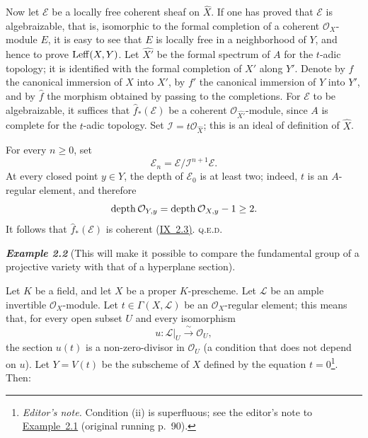 \medskip
Now let $\mathcal E$ be a locally free coherent sheaf on $\widehat X$. If
one has proved that $\mathcal E$ is algebraizable, that is, isomorphic to the
formal completion of a coherent $\mathcal O_X$-module $E$, it is easy to see
that $E$ is locally free in a neighborhood of $Y$, and hence to prove
$\operatorname{Leff}(X,Y)$. Let $\widehat{X'}$ be the formal spectrum of $A$ for the
$t$-adic topology; it is identified with the formal completion of $X'$ along
$Y'$. Denote by $f$ the canonical immersion of $X$ into $X'$, by $f'$ the
canonical immersion of $Y$ into $Y'$, and by $\widehat f$ the morphism
obtained by passing to the completions. For $\mathcal E$ to be algebraizable,
it suffices that $\widehat f_*(\mathcal E)$ be a coherent
$\mathcal O_{\widehat{X'}}$-module, since $A$ is complete for the $t$-adic
topology.
Set $\mathcal I=t\mathcal O_{\widehat X}$; this is an ideal of definition of
$\widehat X$.

For every $n\geq0$, set
\[
  \mathcal E_n=\mathcal E/\mathcal I^{n+1}\mathcal E.
\]
At every closed point $y\in Y$, the depth of $\mathcal E_0$ is at least two;
indeed, $t$ is an $A$-regular element, and therefore
\[
  \operatorname{depth}\mathcal O_{Y,y}
  =\operatorname{depth}\mathcal O_{X,y}-1\geq2.
\]
It follows that $\widehat f_*(\mathcal E)$ is coherent (\hyperref[IX.2.3]{IX~2.3)}.
\hfill\textsc{q.e.d.}

\medskip
{}\noindent\textbf{\textit{Example 2.2}}\quad
\textup{(This will make it possible to compare the fundamental group of a
projective variety with that of a hyperplane section).}

Let $K$ be a field, and let $X$ be a proper $K$-prescheme. Let $\mathcal L$
be an ample invertible $\mathcal O_X$-module. Let
$t\in\Gamma(X,\mathcal L)$ be an $\mathcal O_X$-regular element; this means
that, for every open subset $U$ and every isomorphism
\[
  u\colon \mathcal L|_U \xrightarrow{\ \sim\ } \mathcal O_U,
\]
the section $u(t)$ is a non-zero-divisor in $\mathcal O_U$ (a condition that
does not depend on $u$). Let $Y=V(t)$ be the subscheme of $X$ defined by the
equation $t=0$\footnote{\textit{Editor's note.} Condition (ii) is
superfluous; see the editor's note to \hyperref[X.2.1]{Example~2.1} (original running p.~90).}.
Then:

